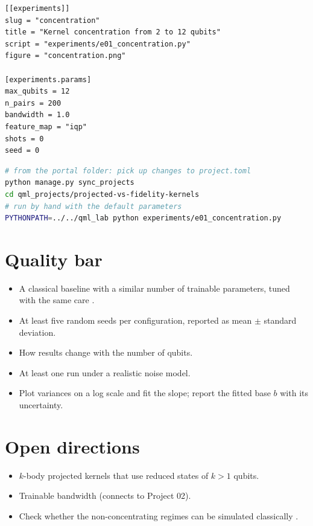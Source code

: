\documentclass[11pt,a4paper]{article}
\begin{document}
\begin{lstlisting}[language={}]
[[experiments]]
slug = "concentration"
title = "Kernel concentration from 2 to 12 qubits"
script = "experiments/e01_concentration.py"
figure = "concentration.png"

[experiments.params]
max_qubits = 12
n_pairs = 200
bandwidth = 1.0
feature_map = "iqp"
shots = 0
seed = 0
\end{lstlisting}

\begin{lstlisting}[language=bash]
# from the portal folder: pick up changes to project.toml
python manage.py sync_projects
cd qml_projects/projected-vs-fidelity-kernels
# run by hand with the default parameters
PYTHONPATH=../../qml_lab python experiments/e01_concentration.py
\end{lstlisting}

\section{Quality bar}
\begin{itemize}
  \item A classical baseline with a similar number of trainable parameters, tuned with the same care \citep{bowles2024}.
  \item At least five random seeds per configuration, reported as mean $\pm$ standard deviation.
  \item How results change with the number of qubits.
  \item At least one run under a realistic noise model.
  \item Plot variances on a log scale and fit the slope; report the fitted base $b$ with its uncertainty.
\end{itemize}

\section{Open directions}
\begin{itemize}
  \item $k$-body projected kernels that use reduced states of $k>1$ qubits.
  \item Trainable bandwidth (connects to Project 02).
  \item Check whether the non-concentrating regimes can be simulated classically \citep{cerezo2023simulability}.
\end{itemize}
\end{document}
